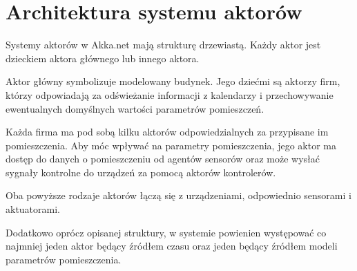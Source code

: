 \section{Architektura systemu aktorów}
Systemy aktorów w Akka.net mają strukturę drzewiastą. 
Każdy aktor jest dzieckiem aktora głównego lub innego aktora. 



Aktor główny symbolizuje modelowany budynek.
Jego dziećmi są aktorzy firm, którzy odpowiadają za odświeżanie informacji z kalendarzy i przechowywanie ewentualnych domyślnych wartości parametrów pomieszczeń.

Każda firma ma pod sobą kilku aktorów odpowiedzialnych za przypisane im pomieszczenia.
Aby móc wpływać na parametry pomieszczenia, jego aktor ma dostęp do danych o pomieszczeniu od agentów sensorów oraz może wysłać sygnały kontrolne do urządzeń za pomocą aktorów kontrolerów.

Oba powyższe rodzaje aktorów łączą się z urządzeniami, odpowiednio sensorami i aktuatorami.

Dodatkowo oprócz opisanej struktury, w systemie powienien występować co najmniej jeden aktor będący źródłem czasu oraz jeden będący źródłem modeli parametrów pomieszczenia.
